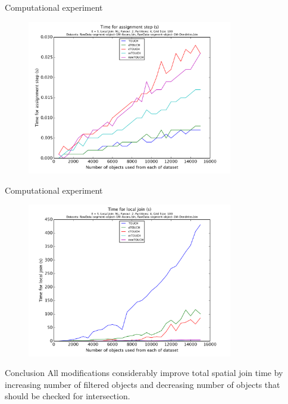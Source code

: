 \documentclass{beamer}
\begin{document}
\begin{frame}{Computational experiment}
\begin{figure}[p]
    \centering
    \includegraphics[width=0.8\textwidth]{Images/pic20.png}
\end{figure}
\end{frame}
\begin{frame}{Computational experiment}
\begin{figure}[p]
    \centering
    \includegraphics[width=0.8\textwidth]{Images/pic22.png}
\end{figure}
\end{frame}
\begin{frame}{Conclusion}
All modifications considerably improve total spatial join time by increasing number of filtered objects and decreasing number of objects that should be checked for intersection.
\end{frame}
\end{document}
